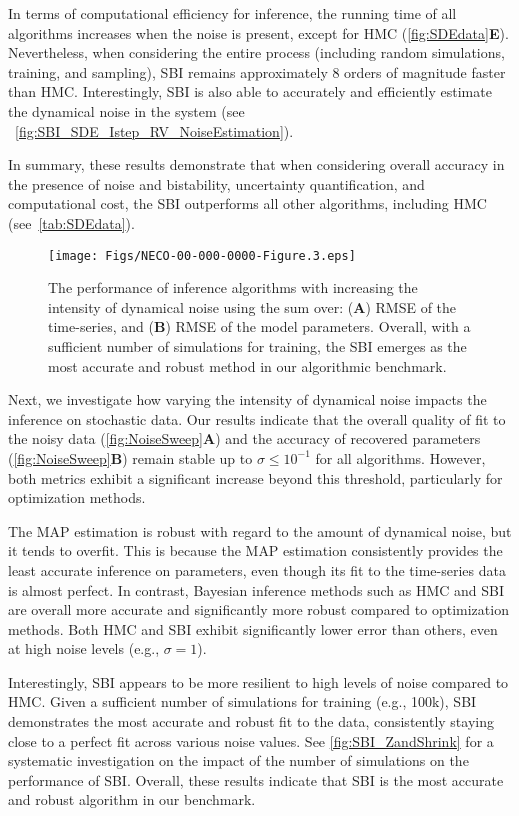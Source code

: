 \documentclass[12pt]{article}
\begin{document}
In terms of computational efficiency for inference, the running time of all algorithms increases when the noise is present, except for HMC (\autoref{fig:SDEdata}\textbf{E}). Nevertheless, when considering the entire process (including random simulations, training, and sampling), SBI remains approximately 8 orders of magnitude faster than HMC. Interestingly, SBI is also able to accurately and efficiently estimate the dynamical noise in the system (see ~\autoref{fig:SBI_SDE_Istep_RV_NoiseEstimation}). 

In summary, these results demonstrate that when considering overall accuracy in the presence of noise and bistability, uncertainty quantification, and computational cost, the SBI outperforms all other algorithms, including HMC (see~\autoref{tab:SDEdata}). 


\begin{figure}[ht]
    \centering
    \texttt{[image: Figs/NECO-00-000-0000-Figure.3.eps]}
    \caption{The performance of inference algorithms with increasing the intensity of dynamical noise using the sum over: (\textbf{A}) RMSE of the time-series, and (\textbf{B}) RMSE of the model parameters. Overall, with a sufficient number of simulations for training, the SBI emerges as the most accurate and robust method in our algorithmic benchmark.
    }
    \label{fig:NoiseSweep}
\end{figure}


Next, we investigate how varying the intensity of dynamical noise impacts the inference on stochastic data. Our results indicate that the overall quality of fit to the noisy data (\autoref{fig:NoiseSweep}\textbf{A}) and the accuracy of recovered parameters (\autoref{fig:NoiseSweep}\textbf{B}) remain stable up to $\sigma \leq 10^{-1}$ for all algorithms. However, both metrics exhibit a significant increase beyond this threshold, particularly for optimization methods. 

The MAP estimation is robust with regard to the amount of dynamical noise, but it tends to overfit. This is because the MAP estimation consistently provides the least accurate inference on parameters, even though its fit to the time-series data is almost perfect. In contrast, Bayesian inference methods such as HMC and SBI are overall more accurate and significantly more robust compared to optimization methods.  Both HMC and SBI exhibit significantly lower error than others, even at high noise levels (e.g., $\sigma = 1$). 

Interestingly, SBI appears to be more resilient to high levels of noise compared to HMC. Given a sufficient number of simulations for training (e.g., 100k), SBI demonstrates the most accurate and robust fit to the data, consistently staying close to a perfect fit across various noise values. See \autoref{fig:SBI_ZandShrink} for a systematic investigation on the impact of the number of simulations on the performance of SBI.  Overall, these results indicate that SBI is the most accurate and robust algorithm in our benchmark.
\end{document}
